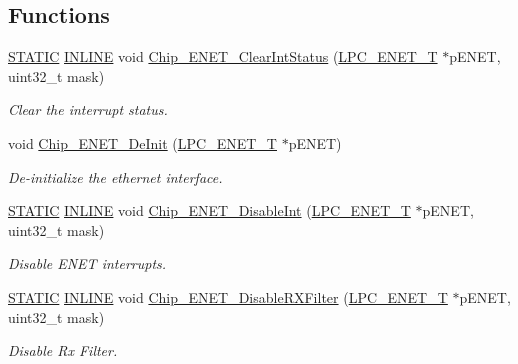 \subsection*{Functions}
\begin{DoxyCompactItemize}
\item 
\hyperlink{group__LPC__Types__Public__Macros_ga10b2d890d871e1489bb02b7e70d9bdfb}{S\+T\+A\+T\+IC} \hyperlink{group__LPC__Types__Public__Types_ga2eb6f9e0395b47b8d5e3eeae4fe0c116}{I\+N\+L\+I\+NE} void \hyperlink{group__ENET__17XX__40XX_ga0a574e2cc8946c200d71152722ac30d7}{Chip\+\_\+\+E\+N\+E\+T\+\_\+\+Clear\+Int\+Status} (\hyperlink{structLPC__ENET__T}{L\+P\+C\+\_\+\+E\+N\+E\+T\+\_\+T} $\ast$p\+E\+N\+ET, uint32\+\_\+t mask)
\begin{DoxyCompactList}\small\item\em Clear the interrupt status. \end{DoxyCompactList}\item 
void \hyperlink{group__ENET__17XX__40XX_ga94eb7a70f4023c83ca18e4e675ad0b32}{Chip\+\_\+\+E\+N\+E\+T\+\_\+\+De\+Init} (\hyperlink{structLPC__ENET__T}{L\+P\+C\+\_\+\+E\+N\+E\+T\+\_\+T} $\ast$p\+E\+N\+ET)
\begin{DoxyCompactList}\small\item\em De-\/initialize the ethernet interface. \end{DoxyCompactList}\item 
\hyperlink{group__LPC__Types__Public__Macros_ga10b2d890d871e1489bb02b7e70d9bdfb}{S\+T\+A\+T\+IC} \hyperlink{group__LPC__Types__Public__Types_ga2eb6f9e0395b47b8d5e3eeae4fe0c116}{I\+N\+L\+I\+NE} void \hyperlink{group__ENET__17XX__40XX_ga708d5e95e8c437779028713075a55117}{Chip\+\_\+\+E\+N\+E\+T\+\_\+\+Disable\+Int} (\hyperlink{structLPC__ENET__T}{L\+P\+C\+\_\+\+E\+N\+E\+T\+\_\+T} $\ast$p\+E\+N\+ET, uint32\+\_\+t mask)
\begin{DoxyCompactList}\small\item\em Disable E\+N\+ET interrupts. \end{DoxyCompactList}\item 
\hyperlink{group__LPC__Types__Public__Macros_ga10b2d890d871e1489bb02b7e70d9bdfb}{S\+T\+A\+T\+IC} \hyperlink{group__LPC__Types__Public__Types_ga2eb6f9e0395b47b8d5e3eeae4fe0c116}{I\+N\+L\+I\+NE} void \hyperlink{group__ENET__17XX__40XX_ga591bdc31e1ca992c3ac642c8d64d3ac9}{Chip\+\_\+\+E\+N\+E\+T\+\_\+\+Disable\+R\+X\+Filter} (\hyperlink{structLPC__ENET__T}{L\+P\+C\+\_\+\+E\+N\+E\+T\+\_\+T} $\ast$p\+E\+N\+ET, uint32\+\_\+t mask)
\begin{DoxyCompactList}\small\item\em Disable Rx Filter. \end{DoxyCompactList}\item 

\end{DoxyCompactItemize}
